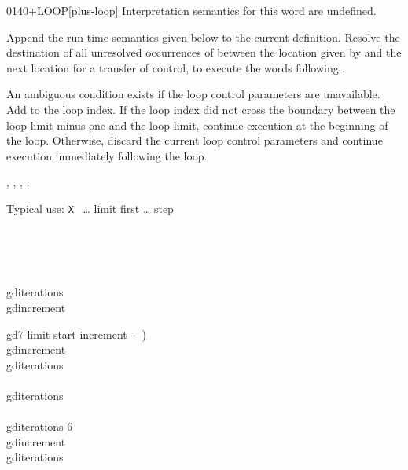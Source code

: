\begin{worddef}{0140}{+LOOP}[plus-loop]
\interpret
	Interpretation semantics for this word are undefined.

\compile

	Append the run-time semantics given below to the current
	definition. Resolve the destination of all unresolved
	occurrences of  between the location given
	by  and the next location for a transfer of
	control, to execute the words following .

\runtime

	An ambiguous condition exists if the loop control parameters
	are unavailable. Add  to the loop index. If the loop
	index did not cross the boundary between the loop limit minus
	one and the loop limit, continue execution at the beginning
	of the loop. Otherwise, discard the current loop control
	parameters and continue execution immediately following the
	loop.

\see {},
	,
	,
	.

	\begin{rationale} %
		Typical use:
			\word{:} \texttt{X} ~{\ldots} limit first 
				{\ldots} step 
			\word{;}
	\end{rationale}

	\begin{testing} %
		\ttfamily
		 \\
		 \\
		 \\

		 gditerations \\
		 gdincrement

		\word{:} gd7  limit start increment -{}- ) \\
		\tab gdincrement \word{!} \\
		 gditerations \word{!} \\
		\tab {} \\
		 gditerations \word{+!} \\
		\tab[2]  \\
		\tab[2] gditerations   6 \word{=}    \\
		\tab[2] gdincrement  \\
		\tab {} gditerations  \\
		\word{;}


\end{testing}
\end{worddef}
